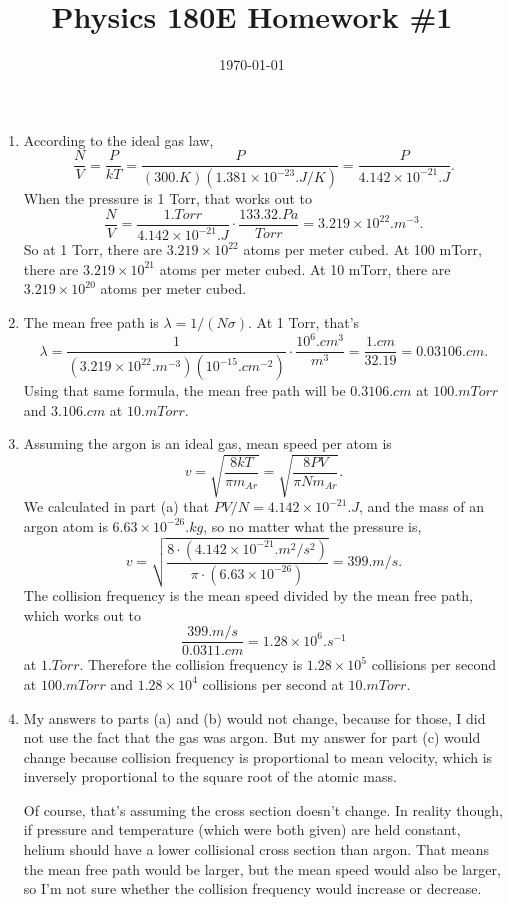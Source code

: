 \documentclass{article}
\date{\today}
\title{Physics 180E Homework \#1}
\begin{document}
\maketitle

\begin{prob}
\end{prob}
\begin{enumerate}[label=(\alph*)]
    \item According to the ideal gas law,
        \[ \frac{N}{V} = \frac{P}{kT} = \frac{P}{\left( 300 \si{.K} \right) \left( 1.381 \times 10^{-23} \si{.J/K} \right)} = \frac{P}{4.142 \times 10^{-21} \si{.J}}. \]
        When the pressure is 1 Torr, that works out to
        \[ \frac{N}{V} = \frac{1 \si{.Torr}}{ 4.142 \times 10^{-21} \si{.J}} \cdot \frac{133.32 \si{.Pa}}{\si{Torr}} = 3.219 \times 10^{22} \si{.m^{-3}}. \]
        So at 1 Torr, there are $3.219 \times 10^{22}$ atoms per meter cubed. At 100 mTorr, there are $3.219 \times 10^{21}$ atoms per meter cubed. At 10 mTorr, there are $3.219 \times 10^{20}$ atoms per meter cubed.
    \item The mean free path is $\lambda=1/(N \sigma)$. At 1 Torr, that's
        \[ \lambda = \frac{1}{\left( 3.219 \times 10^{22}\si{.m^{-3}} \right) \left( 10^{-15} \si{.cm^{-2}} \right) } \cdot \frac{10^6 \si{.cm^3}}{\si{m^3}} = \frac{1 \si{.cm}}{32.19} = 0.03106 \si{.cm}. \]
        Using that same formula, the mean free path will be $0.3106\si{.cm}$ at $100 \si{.mTorr}$ and $3.106 \si{.cm}$ at $10 \si{.mTorr}$.
    \item Assuming the argon is an ideal gas, mean speed per atom is
        \[ v = \sqrt{ \frac{8 k T}{\pi m_{Ar}}} = \sqrt{ \frac{8PV}{\pi N m_{Ar}}}. \]
        We calculated in part (a) that $PV/N = 4.142 \times 10^{-21}\si{.J}$, and the mass of an argon atom is $6.63 \times 10^{-26} \si{.kg}$, so no matter what the pressure is,
        \[ v = \sqrt{ \frac{8 \cdot (4.142 \times 10^{-21} \si{.m^2/s^2})}{\pi\cdot(6.63\times10^{-26})}} = 399 \si{.m/s}. \]
        The collision frequency is the mean speed divided by the mean free path, which works out to
        \[ \frac{399\si{.m/s}}{0.0311\si{.cm}} = 1.28\times 10^6 \si{.s^{-1}} \]
        at $1 \si{.Torr}$. Therefore the collision frequency is $1.28\times 10^5$ collisions per second at $100\si{.mTorr}$ and $1.28\times 10^4$ collisions per second at $10\si{.mTorr}$.
    \item My answers to parts (a) and (b) would not change, because for those, I did not use the fact that the gas was argon. But my answer for part (c) would change because collision frequency is proportional to mean velocity, which is inversely proportional to the square root of the atomic mass.
        \par
        Of course, that's assuming the cross section doesn't change. In reality though, if pressure and temperature (which were both given) are held constant, helium should have a lower collisional cross section than argon. That means the mean free path would be larger, but the mean speed would also be larger, so I'm not sure whether the collision frequency would increase or decrease.
\end{enumerate}
\end{document}

